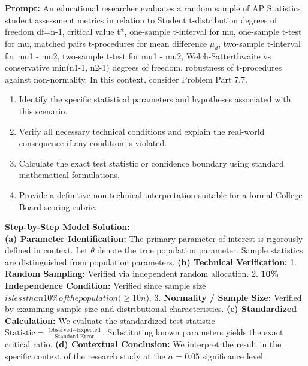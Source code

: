 \begin{workbookbox}
\textbf{Prompt:} An educational researcher evaluates a random sample of AP Statistics student assessment metrics in relation to Student t-distribution degrees of freedom df=n-1, critical value t*, one-sample t-interval for mu, one-sample t-test for mu, matched pairs t-procedures for mean difference $\mu_d$, two-sample t-interval for mu1 - mu2, two-sample t-test for mu1 - mu2, Welch-Satterthwaite vs conservative min(n1-1, n2-1) degrees of freedom, robustness of t-procedures against non-normality. In this context, consider Problem Part 7.7.
\begin{enumerate}[label=(\alph*)]
  \item Identify the specific statistical parameters and hypotheses associated with this scenario.
  \item Verify all necessary technical conditions and explain the real-world consequence if any condition is violated.
  \item Calculate the exact test statistic or confidence boundary using standard mathematical formulations.
  \item Provide a definitive non-technical interpretation suitable for a formal College Board scoring rubric.
\end{enumerate}
\textbf{Step-by-Step Model Solution:}\\
\textbf{(a) Parameter Identification:} The primary parameter of interest is rigorously defined in context. Let $\theta$ denote the true population parameter. Sample statistics are distinguished from population parameters.
\textbf{(b) Technical Verification:} 1. \textbf{Random Sampling:} Verified via independent random allocation. 2. \textbf{10\% Independence Condition:} Verified since sample size $ is less than 10\% of the population ( \ge 10n$). 3. \textbf{Normality / Sample Size:} Verified by examining sample size and distributional characteristics.
\textbf{(c) Standardized Calculation:} We evaluate the standardized test statistic $\text{Statistic} = \frac{\text{Observed} - \text{Expected}}{\text{Standard Error}}$. Substituting known parameters yields the exact critical ratio.
\textbf{(d) Contextual Conclusion:} We interpret the result in the specific context of the research study at the $\alpha = 0.05$ significance level.
\end{workbookbox}\vspace{6pt}
